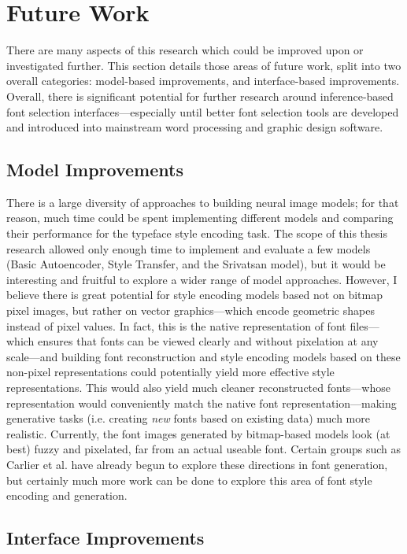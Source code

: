 \section{Future Work}

There are many aspects of this research which could be improved upon or investigated further. This section details those areas of future work, split into two overall categories: model-based improvements, and interface-based improvements. Overall, there is significant potential for further research around inference-based font selection interfaces---especially until better font selection tools are developed and introduced into mainstream word processing and graphic design software.

\subsection{Model Improvements}

There is a large diversity of approaches to building neural image models; for that reason, much time could be spent implementing different models and comparing their performance for the typeface style encoding task. The scope of this thesis research allowed only enough time to implement and evaluate a few models (Basic Autoencoder, Style Transfer, and the Srivatsan model), but it would be interesting and fruitful to explore a wider range of model approaches. However, I believe there is great potential for style encoding models based not on bitmap pixel images, but rather on vector graphics---which encode geometric shapes instead of pixel values. In fact, this is the native representation of font files---which ensures that fonts can be viewed clearly and without pixelation at any scale---and building font reconstruction and style encoding models based on these non-pixel representations could potentially yield more effective style representations. This would also yield much cleaner reconstructed fonts---whose representation would conveniently match the native font representation---making generative tasks (i.e. creating \textit{new} fonts based on existing data) much more realistic. Currently, the font images generated by bitmap-based models look (at best) fuzzy and pixelated, far from an actual useable font. Certain groups such as Carlier et al. \cite{carlier2020} have already begun to explore these directions in font generation, but certainly much more work can be done to explore this area of font style encoding and generation.

\subsection{Interface Improvements}

